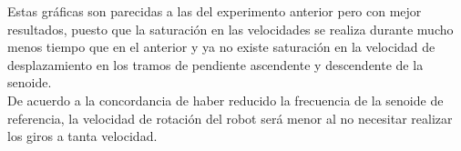 \documentclass[a4paper,twoside]{article}
\begin{document}
\begin{itemize}
	Estas gráficas son parecidas a las del experimento anterior pero con mejor resultados, puesto que la saturación en las velocidades se realiza durante mucho menos tiempo que en el anterior y ya no existe saturación en la velocidad de desplazamiento en los tramos de pendiente ascendente y descendente de la senoide.\\
	De acuerdo a la concordancia de haber reducido la frecuencia de la senoide de referencia, la velocidad de rotación del robot será menor al no necesitar realizar los giros a tanta velocidad.



	\end{itemize}





%
%
\end{document}
